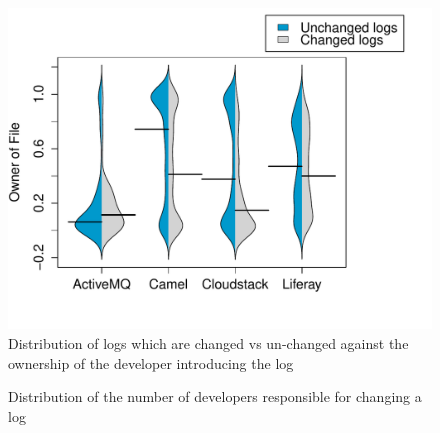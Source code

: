 \begin{figure}[tb]
	\centering
	\includegraphics[width=1\linewidth]{ChangedvsUnchangedlogs}
	\caption{Distribution of logs which are changed vs un-changed against the ownership of the developer introducing the log}
	\label{fig:ChangedvsUnchangedlogs}
\end{figure}
\begin{figure}[tb]
	
	\centering
	\caption{Distribution of the number of developers responsible for changing a log}
	\label{fig:NumberofDevelopers}
\end{figure}



